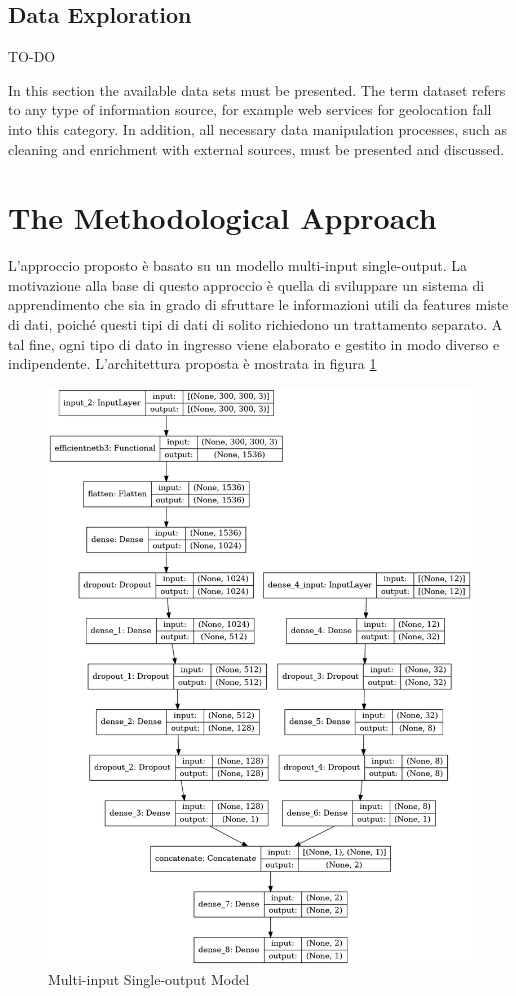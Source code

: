     \subsection{Data Exploration}
    TO-DO

    In this section the available data sets must be presented. The term dataset refers to any type of information source, for example web services for geolocation fall into this category. 
    In addition, all necessary data manipulation processes, such as cleaning and enrichment with external sources, must be presented and discussed.

\section{The Methodological Approach}


    L'approccio proposto è basato su un modello multi-input single-output. La motivazione alla base di questo approccio è quella di sviluppare un sistema di apprendimento che sia in grado di sfruttare le informazioni utili da features miste di dati, poiché questi tipi di dati di solito richiedono un trattamento separato. A tal fine, ogni tipo di dato in ingresso viene elaborato e gestito in modo diverso e indipendente. L'architettura proposta è mostrata in figura \ref{fig:model}


    \begin{figure}[h!]
        \centering
        \includegraphics[scale=0.35]{../Plot/Model-Plot.png}
        \caption{Multi-input Single-output Model}
        \label{fig:model}
    \end{figure}

